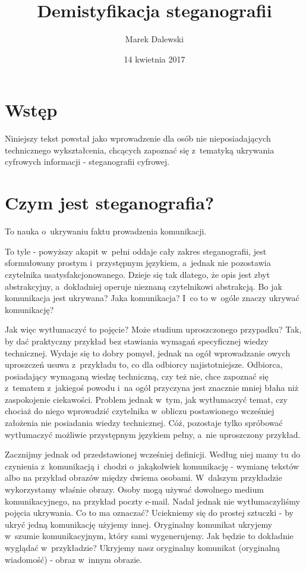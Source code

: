 \documentclass[12pt,a4paper]{article}
\title{Demistyfikacja steganografii}
\author{Marek Dalewski}
\date{14 kwietnia 2017}
\begin{document}
\maketitle

\tableofcontents

\renewcommand*{\thelstlisting}{\arabic{lstlisting}}


\section{Wstęp}
    Niniejszy tekst powstał jako wprowadzenie dla osób nie nieposiadających technicznego wykształcenia, chcących zapoznać się z~tematyką ukrywania cyfrowych informacji - steganografii cyfrowej.

\section{Czym jest steganografia?}
    To nauka o~ukrywaniu faktu prowadzenia komunikacji.

    To tyle - powyższy akapit w~pełni oddaje cały zakres steganografii, jest sformułowany prostym i~przystępnym językiem, a~jednak nie pozostawia czytelnika usatysfakcjonowanego. Dzieje się tak dlatego, że opis jest zbyt abstrakcyjny, a~dokładniej operuje nieznaną czytelnikowi abstrakcją. Bo jak komunikacja jest ukrywana? Jaka komunikacja? I~co to w~ogóle znaczy ukrywać komunikację?

    Jak więc wytłumaczyć to pojęcie? Może studium uproszczonego przypadku? Tak, by dać praktyczny przykład bez stawiania wymagań specyficznej wiedzy technicznej. Wydaje się to dobry pomysł, jednak na ogół wprowadzanie owych uproszczeń usuwa z~przykładu to, co dla odbiorcy najistotniejsze. Odbiorca, posiadający wymaganą wiedzę techniczną, czy też nie, chce zapoznać się z~tematem z~jakiegoś powodu i~na ogół przyczyna jest znacznie mniej błaha niż zaspokojenie ciekawości. Problem jednak w~tym, jak wytłumaczyć temat, czy chociaż do niego wprowadzić czytelnika w~obliczu postawionego wcześniej założenia nie posiadania wiedzy technicznej. Cóż, pozostaje tylko spróbować wytłumaczyć możliwie przystępnym językiem pełny, a~nie uproszczony przykład.

    Zacznijmy jednak od przedstawionej wcześniej definicji. Według niej mamy tu do czynienia z~komunikacją i~chodzi o~jakąkolwiek komunikację - wymianę tekstów albo na przykład obrazów między dwiema osobami. W~dalszym przykładzie wykorzystamy właśnie obrazy. Osoby mogą używać dowolnego medium komunikacyjnego, na przykład poczty e-mail. Nadal jednak nie wytłumaczyliśmy pojęcia ukrywania. Co to ma oznaczać? Uciekniemy się do prostej sztuczki - by ukryć jedną komunikację użyjemy innej. Oryginalny komunikat ukryjemy w~szumie komunikacyjnym, który sami wygenerujemy. Jak będzie to dokładnie wyglądać w~przykładzie? Ukryjemy nasz oryginalny komunikat (oryginalną wiadomość) - obraz w~innym obrazie.
\end{document}
